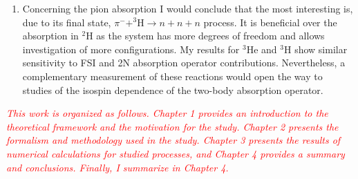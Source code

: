 \documentclass[a4paper, 14pt]{extarticle}
\providecommand{\tmp}[1]
{
\textcolor{red}{\textit{#1}}
}
\begin{document}
\begin{enumerate}
    \item Concerning the pion absorption I would conclude that the most interesting is, due to its final state, 
    $\pi^- + ^3\text{H} \rightarrow n + n + n$ process.
    It is beneficial over the absorption in $^2$H as the system has more degrees of freedom and allows
    investigation of more configurations.
    My results for $^3$He and $^3$H show similar sensitivity to FSI and 2N absorption operator contributions. Nevertheless, a complementary measurement of these reactions would open the way to studies of the isospin dependence of the two-body absorption operator.
\end{enumerate}

\tmp{This work is organized as follows. Chapter 1 provides an introduction to the theoretical framework and the motivation for the study. Chapter 2 presents the formalism and methodology used in the study. Chapter 3 presents the results of numerical calculations for studied processes, and Chapter 4 provides a summary and conclusions.
Finally, I summarize in Chapter 4.}
\end{document}
